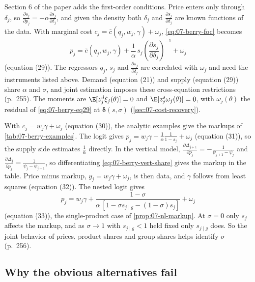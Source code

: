 Section 6 of the paper adds the first-order conditions. Price enters only through $\delta_j$, so $\frac{\partial
s_j}{\partial p_j} = -\alpha\frac{\partial s_j}{\partial\delta_j}$, and given the density both $\delta_j$ and
$\frac{\partial s_j}{\partial\delta_j}$ are known functions of the data. With marginal cost $c_j = \bar c(q_j, w_j,
\gamma) + \omega_j$, \eqref{eq:07-berry-foc} becomes
\begin{equation}\label{eq:07-berry-eq29}
p_j = \bar c(q_j, w_j, \gamma) + \frac{1}{\alpha}\,s_j\left(\frac{\partial s_j}{\partial\delta_j}\right)^{-1} +
\omega_j
\end{equation}
(equation (29)). The regressors $q_j$, $s_j$ and $\frac{\partial s_j}{\partial\delta_j}$ are correlated with
$\omega_j$ and need the instruments listed above. Demand (equation (21)) and supply (equation (29)) share $\alpha$
and $\sigma$, and joint estimation imposes these cross-equation restrictions (p.~255). The moments are $\E[z^d_j
\xi_j(\theta)] = 0$ and $\E[z^s_j\omega_j(\theta)] = 0$, with $\omega_j(\theta)$ the residual of
\eqref{eq:07-berry-eq29} at $\boldsymbol\delta(s, \sigma)$ (\cref{sec:07-cost-recovery}).

With $c_j = w_j\gamma + \omega_j$ (equation (30)), the analytic examples give the markups of
\cref{tab:07-berry-examples}. The logit gives $p_j = w_j\gamma + \frac{1}{\alpha}\frac{1}{1-s_j} + \omega_j$
(equation (31)), so the supply side estimates $\frac{1}{\alpha}$ directly. In the vertical model,
$\frac{\partial\Delta_{j+1}}{\partial p_j} = -\frac{1}{\psi_{j+1}-\psi_j}$ and $\frac{\partial\Delta_j}{\partial
p_j} = \frac{1}{\psi_j - \psi_{j-1}}$, so differentiating \eqref{eq:07-berry-vert-share} gives the markup in the
table. Price minus markup, $y_j = w_j\gamma + \omega_j$, is then data, and $\gamma$ follows from least squares
(equation (32)). The nested logit gives
\begin{equation}\label{eq:07-berry-eq33}
p_j = w_j\gamma + \frac{1-\sigma}{\alpha\,[1 - \sigma s_{j\mid g} - (1-\sigma)s_j]} + \omega_j
\end{equation}
(equation (33)), the single-product case of \cref{prop:07-nl-markup}. At $\sigma = 0$ only $s_j$ affects the
markup, and as $\sigma \to 1$ with $s_{j\mid g} < 1$ held fixed only $s_{j\mid g}$ does. So the joint behavior of prices, product shares and group
shares helps identify $\sigma$ (p.~256).

\subsection{Why the obvious alternatives fail}\label{sec:07-berry-alternatives}

